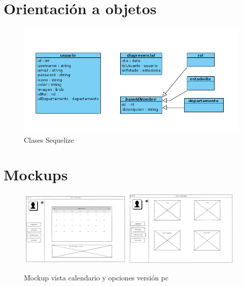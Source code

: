 \documentclass[11pt,spanish,listoffigures,listoftables]{tfgetsinf}
\begin{document}
\section{Orientación a objetos}

\begin{figure}[h!] %
  \includegraphics[width=\linewidth]{img/Clases sequelize.png}
  \caption{Clases Sequelize}
  \label{fig:clasesSequelize}
\end{figure}

\section{Mockups}

\begin{figure}[ht!] %
   \includegraphics[width=0.48\textwidth]{img/Vista_Calendario_PC.png}
   \includegraphics[width=0.48\textwidth]{img/Vista_Opciones_PC.png}
   \caption{Mockup vista calendario y opciones versión pc}
   \label{fig:calendarioPC}
 \end{figure}
\end{document}
